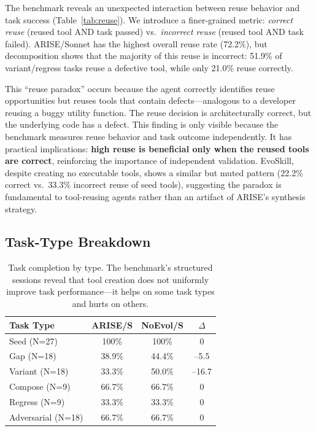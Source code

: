 \documentclass[10pt,twocolumn]{article}
\begin{document}
The benchmark reveals an unexpected interaction between reuse behavior and task success (Table~\ref{tab:reuse}). We introduce a finer-grained metric: \emph{correct reuse} (reused tool AND task passed) vs.\ \emph{incorrect reuse} (reused tool AND task failed). ARISE/Sonnet has the highest overall reuse rate (72.2\%), but decomposition shows that the majority of this reuse is incorrect: 51.9\% of variant/regress tasks reuse a defective tool, while only 21.0\% reuse correctly.

This ``reuse paradox'' occurs because the agent correctly identifies reuse opportunities but reuses tools that contain defects---analogous to a developer reusing a buggy utility function. The reuse decision is architecturally correct, but the underlying code has a defect. This finding is only visible because the benchmark measures reuse behavior and task outcome independently. It has practical implications: \textbf{high reuse is beneficial only when the reused tools are correct}, reinforcing the importance of independent validation. EvoSkill, despite creating no executable tools, shows a similar but muted pattern (22.2\% correct vs.\ 33.3\% incorrect reuse of seed tools), suggesting the paradox is fundamental to tool-reusing agents rather than an artifact of ARISE's synthesis strategy.

\subsection{Task-Type Breakdown}

\begin{table}[t]
\centering
\footnotesize
\begin{tabular}{lccc}
\toprule
\textbf{Task Type} & \textbf{ARISE/S} & \textbf{NoEvol/S} & $\Delta$ \\
\midrule
Seed (N=27) & 100\% & 100\% & 0 \\
Gap (N=18) & 38.9\% & 44.4\% & --5.5 \\
Variant (N=18) & 33.3\% & 50.0\% & --16.7 \\
Compose (N=9) & 66.7\% & 66.7\% & 0 \\
Regress (N=9) & 33.3\% & 33.3\% & 0 \\
Adversarial (N=18) & 66.7\% & 66.7\% & 0 \\
\bottomrule
\end{tabular}
\caption{Task completion by type. The benchmark's structured sessions reveal that tool creation does not uniformly improve task performance---it helps on some task types and hurts on others.}
\label{tab:task_type}
\end{table}
\end{document}
